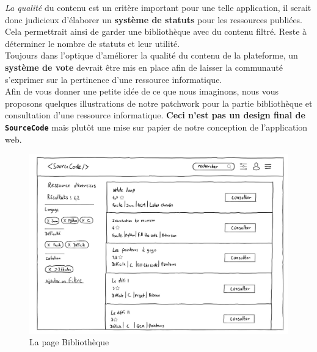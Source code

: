 \textit{La qualité} du contenu est un critère important pour une telle application, il serait donc judicieux d'élaborer un \textbf{système de statuts} pour les ressources publiées. Cela permettrait ainsi de garder une bibliothèque avec du contenu filtré. Reste à déterminer le nombre de statuts et leur utilité.\\

Toujours dans l'optique d'améliorer la qualité du contenu de la plateforme, un \textbf{système de vote} devrait être mis en place afin de laisser la communauté s'exprimer sur la pertinence d'une ressource informatique.\\

Afin de vous donner une petite idée de ce que nous imaginons, nous vous proposons quelques illustrations de notre patchwork pour la partie bibliothèque et consultation d'une ressource informatique. \textbf{Ceci n'est pas un design final de \texttt{SourceCode} } mais plutôt une mise sur papier de notre conception de l'application web.\\

\begin{figure}[H]
    \includegraphics[width=\textwidth,height=\textheight,keepaspectratio]{images/library.JPG}
    \centering
    \caption{La page Bibliothèque}
\end{figure}

